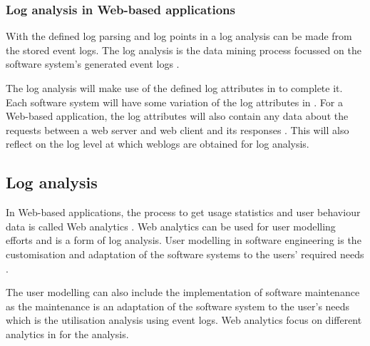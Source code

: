 \subsubsection{Log analysis in Web-based applications}
With the defined log parsing and log points in  a log analysis can be made from the stored event logs. The log analysis is the data mining process focussed on the software system's generated event logs \cite{Slaninova2014}.\par The log analysis will make use of the defined log attributes in  to complete it. Each software system will have some variation of the log attributes in . For a Web-based application, the log attributes will also contain any data about the requests between a web server and web client and its responses \cite{Slaninova2014, Dhanalakshmi2016}. This will also reflect on the log level at which weblogs are obtained for log analysis.


\subsection{Log analysis}\label{sec:ch1_systemUtilisation}
In Web-based applications, the process to get usage statistics and user behaviour data is called Web analytics \cite{Kocsis2012}. Web analytics can be used for user modelling efforts and is a form of log analysis. User modelling in software engineering is the customisation and adaptation of the software systems to the users' required needs \cite{Waqar2017, Paliouras1999}.\par The user modelling can also include the implementation of software maintenance as the maintenance is an adaptation of the software system to the user's needs which is the utilisation analysis using event logs. Web analytics focus on different analytics in  for the analysis. 

